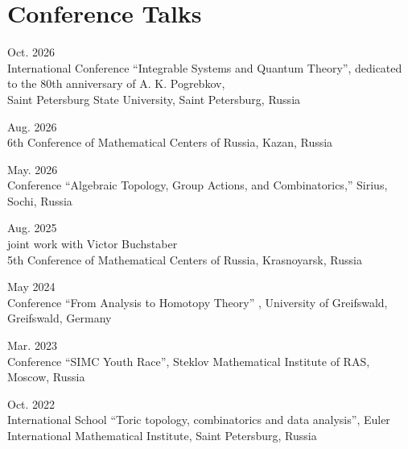 \documentclass[11pt,letterpaper]{report}
\begin{document}
    
    
    
    
    \section*{Conference Talks}

    \begin{tablist}

        \item{Oct. 2026} \\ International Conference ``Integrable Systems and Quantum Theory'', dedicated to the 80th anniversary of A. K. Pogrebkov,\\ Saint Petersburg State University, Saint Petersburg, Russia

        \item{Aug. 2026} \\ 6th Conference of Mathematical Centers of Russia, Kazan, Russia
    
        \item{May. 2026} \\ Conference ``Algebraic Topology, Group Actions, and Combinatorics,'' Sirius, Sochi, Russia
        
       \item{Aug. 2025} \\ joint work with Victor Buchstaber\\ 5th Conference of Mathematical Centers of Russia, Krasnoyarsk, Russia
             
       \item{May 2024} \\ Conference ``From Analysis to Homotopy Theory'' , University of Greifswald, Greifswald, Germany 
    
       \item{Mar. 2023} \\ Conference ``SIMC Youth Race'', Steklov Mathematical Institute of RAS, Moscow, Russia
       
        \item{Oct. 2022} \\ International School ``Toric topology, combinatorics and data analysis'', Euler International Mathematical Institute, Saint Petersburg, Russia
       

\end{tablist}
\end{document}
